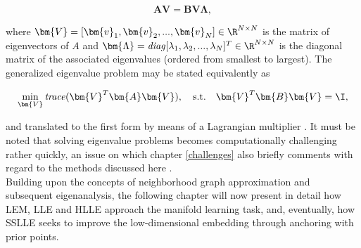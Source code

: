 \begin{equation}
  \bm{A} \bm{V} = \bm{B} \bm{V} \bm{\Lambda},
  \label{eq-gevproblem}
\end{equation}

where $\bm{V} = [\bm{v}_1, \bm{v}_2, ..., \bm{v}_N] \in \R^{N \times N}$ 
is the matrix of eigenvectors of $A$ and 
$\bm{\Lambda} = \text{\textit{diag}}[\lambda_1, \lambda_2, ..., \lambda_N]^T 
\in \R^{N \times N}$ is the diagonal matrix of the associated eigenvalues 
(ordered from smallest to largest).
The generalized eigenvalue problem may be stated equivalently as 

\begin{equation}
  \min_{\bm{V}} \text{\textit{trace}}(\bm{V}^T \bm{A} \bm{V}), \quad \text{s.t.} 
  \quad \bm{V}^T \bm{B} \bm{V} = \I,
  \label{eq-gevproblem-max}
\end{equation}

and translated to the first form by means of a Lagrangian multiplier \citep{ghojoghetal2019}.
It must be noted that solving eigenvalue problems becomes computationally 
challenging rather quickly, an issue on which chapter \ref{challenges} 
also briefly comments with regard to the methods discussed here 
\citep{boermmehl2012}.
\\

Building upon the concepts of neighborhood graph approximation and subsequent 
eigenanalysis, the following chapter will now present in detail how LEM, LLE and 
HLLE approach the manifold learning task, and, eventually, how SSLLE seeks to 
improve the low-dimensional embedding through anchoring with prior points.

